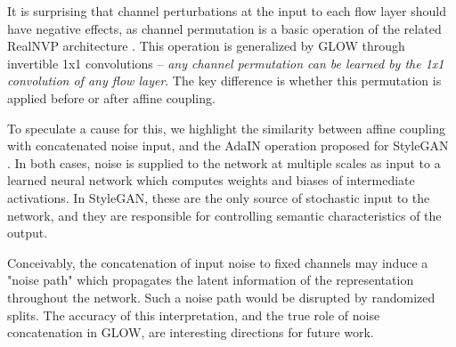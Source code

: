 It is surprising that channel perturbations at the input to each flow layer should have negative effects, as channel permutation is a basic operation of the related RealNVP architecture \cite{dinh2016nvp}. This operation is generalized by GLOW through invertible 1x1 convolutions -- \textit{any channel permutation can be learned by the 1x1 convolution of any flow layer}. The key difference is whether this permutation is applied before or after affine coupling.

To speculate a cause for this, we highlight the similarity between affine coupling with concatenated noise input, and the AdaIN operation proposed for StyleGAN \cite{karras2018stylebased}. In both cases, noise is supplied to the network at multiple scales as input to a learned neural network which computes weights and biases of intermediate activations. In StyleGAN, these are the only source of stochastic input to the network, and they are responsible for controlling semantic characteristics of the output. 

Conceivably, the concatenation of input noise to fixed channels may induce a "noise path" which propagates the latent information of the representation throughout the network. Such a noise path would be disrupted by randomized splits. The accuracy of this interpretation, and the true role of noise concatenation in GLOW, are interesting directions for future work. 